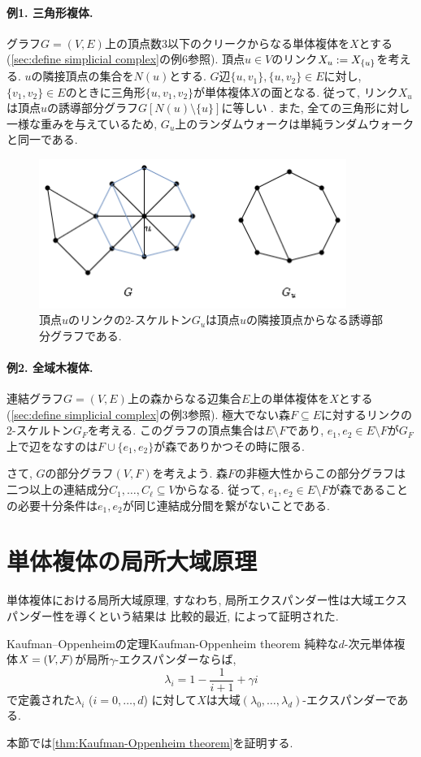 \paragraph*{例1. 三角形複体.}
グラフ$G=(V,E)$上の頂点数$3$以下のクリークからなる単体複体を$X$とする (\cref{sec:define simplicial complex}の例6参照).
頂点$u \in V$のリンク$X_u \mathrel{:=} X_{\{u\}}$を考える.
$u$の隣接頂点の集合を$N(u)$とする.
$G$辺$\{u,v_1\},\{u,v_2\}\in E$に対し, $\{v_1,v_2\}\in E$のときに三角形$\{u,v_1,v_2\}$が単体複体$X$の面となる.
従って, リンク$X_u$は頂点$u$の誘導部分グラフ$G[N(u)\setminus\{u\}]$に等しい .
また, 全ての三角形に対し一様な重みを与えているため, $G_u$上のランダムウォークは単純ランダムウォークと同一である.
\begin{figure}
    \begin{center}
    \includegraphics[width=10cm]{images/localwalk1.png}
    \caption{頂点$u$のリンクの2-スケルトン$G_u$は頂点$u$の隣接頂点からなる誘導部分グラフである.}
    \end{center}
\end{figure}
\paragraph*{例2. 全域木複体.}
連結グラフ$G=(V,E)$上の森からなる辺集合$E$上の単体複体を$X$とする (\cref{sec:define simplicial complex}の例3参照).
極大でない森$F\subseteq E$に対するリンクの$2$-スケルトン$G_F$を考える.
このグラフの頂点集合は$E\setminus F$であり, $e_1,e_2 \in E \setminus F$が$G_F$上で辺をなすのは$F \cup \{e_1,e_2\}$が森でありかつその時に限る.

さて, $G$の部分グラフ$(V,F)$を考えよう.
森$F$の非極大性からこの部分グラフは二つ以上の連結成分$C_1,\dots,C_\ell \subseteq V$からなる.
従って, $e_1,e_2\in E\setminus F$が森であることの必要十分条件は$e_1,e_2$が同じ連結成分間を繋がないことである.



\section{単体複体の局所大域原理}
単体複体における局所大域原理,
すなわち, 局所エクスパンダー性は大域エクスパンダー性を導くという結果は
比較的最近, \citet{KO20}によって証明された.
\begin{theorem}{Kaufman--Oppenheimの定理}{Kaufman-Oppenheim theorem}
    純粋な$d$-次元単体複体$X = (V,\mathcal{F})$が局所$\gamma$-エクスパンダーならば,
    \[ \lambda_i = 1-\frac{1}{i+1} + \gamma i\]
    で定義された$\lambda_i$ ($i=0,\dots,d$) に対して$X$は大域$(\lambda_0,\dots,\lambda_{d})$-エクスパンダーである.
\end{theorem}
本節では\cref{thm:Kaufman-Oppenheim theorem}を証明する.

